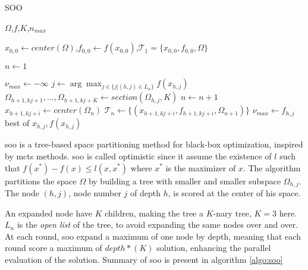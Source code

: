 \begin{algorithm}
\caption{SOO}
\label{algo:soo}
\begin{algorithmic}[1]
\Require $\Omega$,$f$,$K$,$n_{max}$ 

\State $x_{0,0} \gets center(\Omega)$,$f_{0,0} \gets    f(x_{0,0})$,$\mathcal T_1 = \{x_{0,0},f_{0,0},\Omega\}$ 

\State $n \gets 1$

    \State $\nu_{max} \gets - \infty$
        \State $j \gets \arg \max_{j \in \{j | (h,j) \in L_n\}} f(x_{h,j})$ 
            \State $\Omega_{h+1,kj+1},\dots,\Omega_{h+1,kj+K} \gets section(\Omega_{h,j},K)$ 
                \State $n \gets n+1$
                \State $x_{h+1,kj+i} \gets center(\Omega_{n})$
                \State $\mathcal T_n \gets \{(x_{h+1,kj+i},f_{h+1,kj+i},\Omega_{n+1})\}$ 
            \EndFor  
            \State $\nu_{max} \gets f_{h,j}$
        \EndIf
    \EndFor
\EndWhile\\
\Return best of $x_{h,j},f(x_{h,j})$
\end{algorithmic}
\end{algorithm}

\acrshort{soo} is a tree-based space partitioning method for black-box optimization, inspired by \acrfull{mcts} methods. \acrshort{soo} is called optimistic since it assume the existence of $ l$ such that $f(x^*)-f(x) \leq l(x,x^*)$ where $x^*$ is the maximizer of $x$. The algorithm partitions the space $\Omega$ by building a tree with smaller and smaller subspace $\Omega_{h,j}$. The node $(h,j)$, node number $j$ of depth $h$, is scored at the center of his space. 

An expanded node have $K$ children, making the tree a $K$-nary tree, $K=3$ here. $L_n$ is the \textit{open list} of the tree, to avoid expanding the same nodes over and over. At each round, \acrshort{soo} expand a maximum of one node by depth, meaning that each round score a maximum of $depth*(K)$ solution, enhancing the parallel evaluation of the solution. Summary of \acrshort{soo} is present in algorithm \ref{algo:soo}

